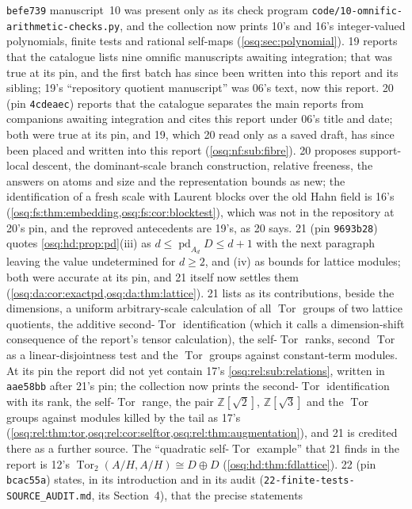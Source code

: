 \documentclass[11pt,letterpaper]{article}
\numberwithin{equation}{section}
\theoremstyle{definition}
\theoremstyle{remark}
\theoremstyle{plain}
\newcommand{\Z}{\mathbb Z}
\newcommand{\Tor}{\operatorname{Tor}}
\newcommand{\pd}{\operatorname{pd}}
\begin{document}
\texttt{befe739} manuscript~10 was present only as its check program \texttt{code/10-omnific-arithmetic-checks.py},
and the collection now prints 10's and 16's integer-valued polynomials, finite tests and rational self-maps
(\cref{osq:sec:polynomial}). 19 reports that the catalogue lists nine omnific manuscripts awaiting integration; that
was true at its pin, and the first batch has since been written into this report and its sibling; 19's ``repository
quotient manuscript'' was 06's text, now this report. 20 (pin \texttt{4cdeaec}) reports that the catalogue separates the
main reports from companions awaiting integration and cites this report under 06's title and date; both were true at its pin,
and 19, which 20 read only as a saved draft, has since been placed and written into this report
(\cref{osq:nf:sub:fibre}). 20 proposes support-local descent, the dominant-scale branch construction, relative freeness, the
answers on atoms and size and the representation bounds as new; the identification of a fresh scale with Laurent blocks
over the old Hahn field is 16's (\cref{osq:fs:thm:embedding,osq:fs:cor:blocktest}), which was not in the repository at 20's pin, and
the reproved antecedents are 19's, as 20 says. 21 (pin \texttt{9693b28}) quotes \cref{osq:hd:prop:pd}(iii) as $d\le\pd_{A_d}D\le d+1$
with the next paragraph leaving the value undetermined for $d\ge2$, and (iv) as bounds for lattice modules; both were accurate at its pin,
and 21 itself now settles them (\cref{osq:da:cor:exactpd,osq:da:thm:lattice}). 21 lists as its contributions, beside the dimensions, a
uniform arbitrary-scale calculation of all $\Tor$ groups of two lattice quotients, the additive second-$\Tor$ identification (which it calls a
dimension-shift consequence of the report's tensor calculation), the self-$\Tor$ ranks, second $\Tor$ as a linear-disjointness test and
the $\Tor$ groups against constant-term modules. At its pin the report did not yet contain 17's \cref{osq:rel:sub:relations}, written in
\texttt{aae58bb} after 21's pin; the collection now prints the second-$\Tor$ identification with its rank, the self-$\Tor$ range, the pair
$\Z[\sqrt2]$, $\Z[\sqrt3]$ and the $\Tor$ groups against modules killed by the tail as 17's
(\cref{osq:rel:thm:tor,osq:rel:cor:selftor,osq:rel:thm:augmentation}), and 21 is credited there as a further source. The ``quadratic
self-$\Tor$ example'' that 21 finds in the report is 12's $\Tor_2(A/H,A/H)\cong D\oplus D$ (\cref{osq:hd:thm:fdlattice}). 22 (pin
\texttt{bcac55a}) states, in its introduction and in its audit (\texttt{22-finite-tests-SOURCE\_AUDIT.md}, its Section~4), that the precise statements
\end{document}
